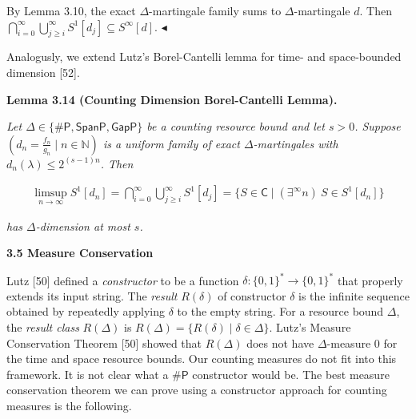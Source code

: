 By Lemma 3.10, the exact $\Delta$-martingale family sums to $\Delta$-martingale $d$. Then $\bigcap\limits_{i=0}^{\infty}\bigcup\limits_{j\geq i}^{\infty}S^{1}[d_{j}]\subseteq S^{\infty}[d]$.
$\blacktriangleleft$\par




Analogusly, we extend Lutz’s Borel-Cantelli lemma for time- and space-bounded dimension [52].\par





\par\medskip\noindent\textbf{
\textbf{Lemma 3.14}\textbf{ }(Counting Dimension Borel-Cantelli Lemma)\textbf{.}
}\par



\emph{Let $\Delta\in\{{\mathsf{\#}\mathsf{P}},\mathsf{SpanP},\mathsf{GapP}\}$ be a counting resource bound and let $s>0$.
Suppose $\left(d_{n}=\frac{f_{n}}{g_{n}}\mid n\in\mathbb{N}\right)$ is a uniform family of
exact $\Delta$-martingales with $d_{n}(\lambda)\leq 2^{(s-1)n}$.
Then}\par


\[\begin{gathered}
\limsup\limits_{n\to\infty}S^{1}[d_{n}]=\bigcap_{i=0}^{\infty}\bigcup_{j\geq i}^{\infty}S^{1}[d_{j}]=\{S\in\mathsf{C}\mid(\exists^{\infty}n)\ S\in S^{1}[d_{n}]\}
\end{gathered}\]


\emph{has $\Delta$-dimension at most $s$.}\par








\par\medskip\noindent\textbf{
3.5 Measure Conservation}\par




Lutz [50] defined a \emph{constructor} to be a function $\delta:\{0,1\}^{*}\to\{0,1\}^{*}$ that properly extends its input string. The \emph{result} $R(\delta)$ of constructor $\delta$ is the infinite sequence obtained by repeatedly applying $\delta$ to the empty string. For a resource bound $\Delta$, the \emph{result class} $R(\Delta)$ is $R(\Delta)=\{R(\delta)\mid\delta\in\Delta\}$.
Lutz’s Measure Conservation Theorem [50] showed that $R(\Delta)$ does not have $\Delta$-measure 0 for the time and space resource bounds. Our counting measures do not fit into this framework. It is not clear what a ${\mathsf{\#}\mathsf{P}}$ constructor would be. The best measure conservation theorem we can prove using a constructor approach for counting measures is the following.\par



